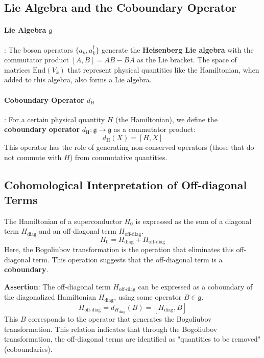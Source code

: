 \documentclass[uplatex,a4j,12pt,dvipdfmx]{article}
\begin{document}
\subsection{Lie Algebra and the Coboundary Operator}

\paragraph{Lie Algebra $\mathfrak{g}$}:
The boson operators $\{a_{k}, a_{k}^{\dagger}\}$ generate the \textbf{Heisenberg Lie algebra} with the commutator product $[A, B] = AB-BA$ as the Lie bracket. The space of matrices $\mathrm{End}(V_{k})$ that represent physical quantities like the Hamiltonian, when added to this algebra, also forms a Lie algebra.

\paragraph{Coboundary Operator $d_{\text{H}}$}:
For a certain physical quantity $H$ (the Hamiltonian), we define the \textbf{coboundary operator} $d_{\text{H}}: \mathfrak{g} \to \mathfrak{g}$ as a commutator product:
\[
    d_{\text{H}}(X) = [H, X]
\]
This operator has the role of generating non-conserved operators (those that do not commute with $H$) from commutative quantities.

\subsection{Cohomological Interpretation of Off-diagonal Terms}

The Hamiltonian of a superconductor $H_{\text{0}}$ is expressed as the sum of a diagonal term $H_{\text{diag}}$ and an off-diagonal term $H_{\text{off-diag}}$.
\[
    H_{\text{0}} = H_{\text{diag}} + H_{\text{off-diag}}
\]
Here, the Bogoliubov transformation is the operation that eliminates this off-diagonal term. This operation suggests that the off-diagonal term is a \textbf{coboundary}.

\textbf{Assertion}: The off-diagonal term $H_{\text{off-diag}}$ can be expressed as a coboundary of the diagonalized Hamiltonian $H_{\text{diag}}$, using some operator $B \in \mathfrak{g}$.
\[
    H_{\text{off-diag}} = d_{H_{\text{diag}}}(B) = [H_{\text{diag}}, B]
\]
This $B$ corresponds to the operator that generates the Bogoliubov transformation. This relation indicates that through the Bogoliubov transformation, the off-diagonal terms are identified as "quantities to be removed" (coboundaries).
\end{document}
